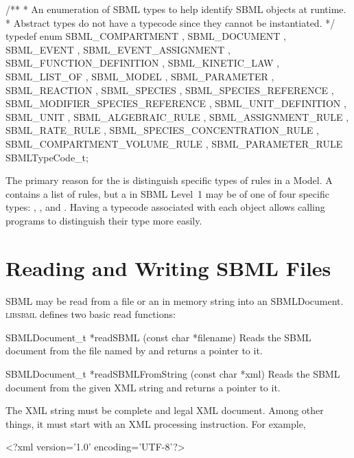 \documentclass{sbmlmanual}
\newcommand{\libsbml}{\textsc{libsbml}}
\begin{document}
\begin{example}[c]
/**
 * An enumeration of SBML types to help identify SBML objects at runtime.
 * Abstract types do not have a typecode since they cannot be instantiated.
 */
typedef enum
{
    SBML_COMPARTMENT
  , SBML_DOCUMENT
  , SBML_EVENT
  , SBML_EVENT_ASSIGNMENT
  , SBML_FUNCTION_DEFINITION
  , SBML_KINETIC_LAW
  , SBML_LIST_OF
  , SBML_MODEL
  , SBML_PARAMETER
  , SBML_REACTION
  , SBML_SPECIES
  , SBML_SPECIES_REFERENCE
  , SBML_MODIFIER_SPECIES_REFERENCE
  , SBML_UNIT_DEFINITION
  , SBML_UNIT
  , SBML_ALGEBRAIC_RULE
  , SBML_ASSIGNMENT_RULE
  , SBML_RATE_RULE
  , SBML_SPECIES_CONCENTRATION_RULE
  , SBML_COMPARTMENT_VOLUME_RULE
  , SBML_PARAMETER_RULE
} SBMLTypeCode_t;
\end{example}

The primary reason for the  is distinguish specific
types of rules in a Model.  A  contains a list of rules,
but a  in SBML Level~1 may be of one of four specific types:
, ,
 and .  Having a typecode
associated with each object allows calling programs to distinguish their
type more easily.


\section{Reading and Writing SBML Files}
\label{sec:reading-sbml}

SBML may be read from a file or an in memory string into an
SBMLDocument.  \libsbml{} defines two basic read functions:

\begin{methoddef}{SBMLDocument\_t *readSBML (const char *filename)}
  Reads the SBML document from the file named by  and
  returns a pointer to it.
\end{methoddef}

\begin{methoddef}{SBMLDocument\_t *readSBMLFromString (const char *xml)}
  Reads the SBML document from the given XML string and returns a pointer
  to it.

  The XML string must be complete and legal XML document.  Among other
  things, it must start with an XML processing instruction.  For example,
  \begin{example}
    <?xml version='1.0' encoding='UTF-8'?>
  \end{example}
\end{methoddef}
\end{document}
